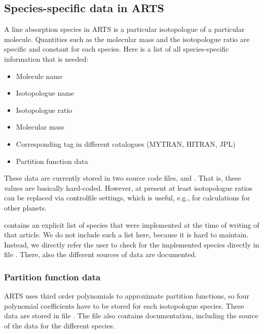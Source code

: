 \subsection{Species-specific data in ARTS}
\label{sec:abs_theory:species_data}

A line absorption species in ARTS is a particular isotopologue of a
particular molecule.  Quantities such as the molecular mass and the
isotopologue ratio are specific and constant for each species.  Here is a
list of all species-specific information that is needed:
\begin{itemize}
\item Molecule name
\item Isotopologue name
\item Isotopologue ratio
\item Molecular mass
\item Corresponding tag in different catalogues (MYTRAN, HITRAN, JPL)
\item Partition function data
\end{itemize}

These data are currently stored in two source code files,
 and . 
That is, these values are basically hard-coded.
However, at present at least isotopologue ratios can be replaced via controlfile
settings, which is useful, e.g., for calculations for other planets.

\citet{buehler:artst:05} contains an explicit list of species that
were implemented at the time of writing of that article.  We do not include
such a list here, because it is hard to maintain. Instead, we directly refer
the user to check for the implemented species directly in file
. There, also the different sources of data
are documented.

\subsubsection{Partition function data}

ARTS uses third order polynomials to approximate partition functions,
so four polynomial coefficients have to be stored for each isotopologue
species. These data are stored in file
. The file also contains
documentation, including the source of the data for the different species.

